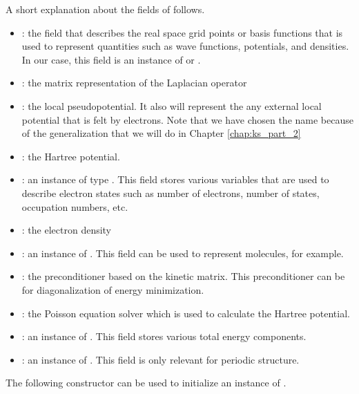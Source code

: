 A short explanation about the fields of  follows.
\begin{itemize}
%
  \item {}: the field that describes the real space grid points or
basis functions that is used to represent quantities such as wave functions,
potentials, and densities. In our case, this field is an instance of
 or .
%
\item {}: the matrix representation of the Laplacian operator
%
\item {}: the local pseudopotential. It also will represent the
any external local potential that is felt by electrons.
Note that we have chosen the name  because of the
generalization that we will do in Chapter \ref{chap:ks_part_2}
%
\item {}: the Hartree potential.
%
\item {}: an instance of type . This field
stores various variables that are used to describe electron states such as number
of electrons, number of states, occupation numbers, etc.
%
\item {}: the electron density
%
\item {}: an instance of . This field can be used to represent
molecules, for example.
%
\item {}: the preconditioner based on the kinetic matrix. This preconditioner
can be for diagonalization of energy minimization.
%
\item {}: the Poisson equation solver which is used to calculate the Hartree
potential.
%
\item {}: an instance of . This field stores
various total energy components.
%
\item {}: an instance of . This field is only relevant for
periodic structure.
%
\end{itemize}


The following constructor can be used to initialize an instance of .


